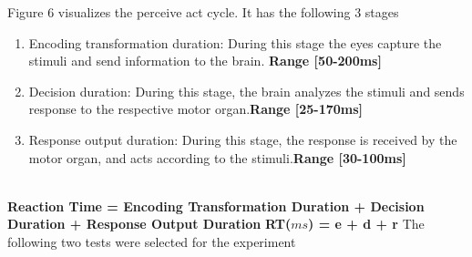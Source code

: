 \documentclass[conference]{IEEEtran}
\begin{document}
Figure 6 visualizes the perceive act cycle. It has the following 3 stages
\begin{enumerate}
    \item Encoding transformation duration: During this stage the eyes capture the stimuli and send information to the brain. \textbf{Range [50-200ms]}
    \item Decision duration: During this stage, the brain analyzes the stimuli and sends response to the respective motor organ.\textbf{Range [25-170ms]}
    \item Response output duration: During this stage, the response is received by the motor organ, and acts according to the stimuli.\textbf{Range [30-100ms]}
\end{enumerate}
\\
\centering \textbf{Reaction Time = Encoding Transformation Duration + Decision Duration + Response Output Duration}
\newline
\newline
\centering \textbf{RT($ms$) = e + d + r}
\newline
\newline
The following two tests were selected for the experiment
\end{document}
